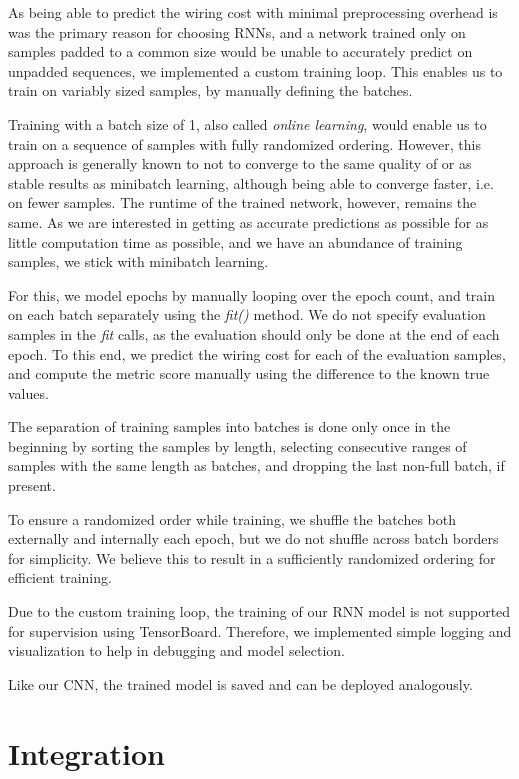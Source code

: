 As being able to predict the wiring cost with minimal preprocessing overhead is was the primary reason for choosing \glspl{RNN}, and a network trained only on samples padded to a common size would be unable to accurately predict on unpadded sequences, we implemented a custom training loop. This enables us to train on variably sized samples, by manually defining the batches.

Training with a batch size of 1, also called \textit{online learning}, would enable us to train on a sequence of samples with fully randomized ordering. However, this approach is generally known to not to converge to the same quality of or as stable results as minibatch learning, although being able to converge faster, i.e. on fewer samples. The runtime of the trained network, however, remains the same. As we are interested in getting as accurate predictions as possible for as little computation time as possible, and we have an abundance of training samples, we stick with minibatch learning.

For this, we model epochs by manually looping over the epoch count, and train on each batch separately using the \textit{fit()} method. We do not specify evaluation samples in the \textit{fit} calls, as the evaluation should only be done at the end of each epoch. To this end, we predict the wiring cost for each of the evaluation samples, and compute the metric score manually using the difference to the known true values.

The separation of training samples into batches is done only once in the beginning by sorting the samples by length, selecting consecutive ranges of samples with the same length as batches, and dropping the last non-full batch, if present.

To ensure a randomized order while training, we shuffle the batches both externally and internally each epoch, but we do not shuffle across batch borders for simplicity. We believe this to result in a sufficiently randomized ordering for efficient training.

Due to the custom training loop, the training of our \gls{RNN} model is not supported for supervision using TensorBoard. Therefore, we implemented simple logging and visualization to help in debugging and model selection.

Like our \gls{CNN}, the trained model is saved and can be deployed analogously.

\section{Integration}

